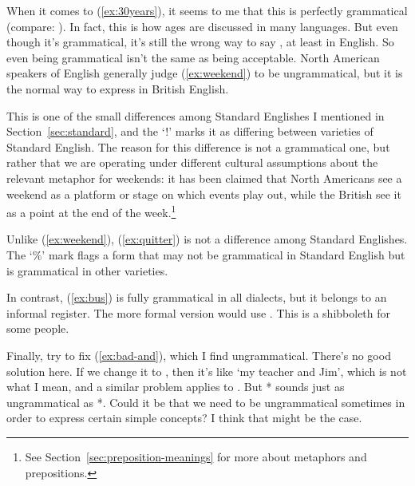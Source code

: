 When it comes to (\ref{ex:30years}), it seems to me that this is perfectly grammatical (compare: ). In fact, this is how ages are discussed in many languages. But even though it's grammatical, it's still the wrong way to say , at least in English. So even being grammatical isn't the same as being acceptable.
\label{ex:30years}
\z
North American speakers of English generally judge (\ref{ex:weekend}) to be ungrammatical, but it is the normal way to express  in British English.

\label{ex:weekend}
\z
This is one of the small differences among Standard Englishes I mentioned in Section~\ref{sec:standard}, and the `!' marks it as differing between varieties of Standard English. The reason for this difference is not a grammatical one, but rather that we are operating under different cultural assumptions about the relevant metaphor for weekends: it has been claimed that North Americans see a weekend as a platform or stage on which events play out, while the British see it as a point at the end of the week.\footnote{See Section~\ref{sec:preposition-meanings} for more about metaphors and prepositions.}

\label{ex:quitter}
\z
Unlike (\ref{ex:weekend}), (\ref{ex:quitter}) is not a difference among Standard Englishes. The `\%' mark flags a form that may not be grammatical in Standard English but is grammatical in other varieties.

\label{ex:bus}
\z
In contrast, (\ref{ex:bus}) is fully grammatical in all dialects, but it belongs to an informal register. The more formal version would use . This is a shibboleth for some people.

Finally, try to fix (\ref{ex:bad-and}), which I find ungrammatical.
\label{ex:bad-and}
\z
There's no good solution here. If we change it to , then it's like `my teacher and Jim', which is not what I mean, and a similar problem applies to . But * sounds just as ungrammatical as *. Could it be that we need to be ungrammatical sometimes in order to express certain simple concepts? I think that might be the case.

